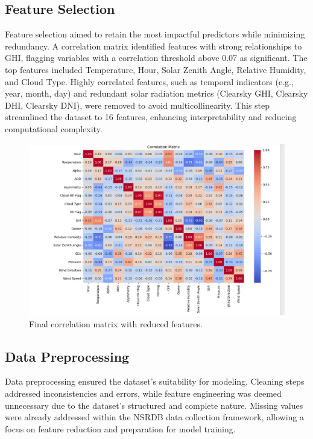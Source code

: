 \documentclass[10pt,twocolumn]{article}
\begin{document}
\begin{itemize}
\subsection{Feature Selection}
Feature selection aimed to retain the most impactful predictors while minimizing redundancy. A correlation matrix identified features with strong relationships to GHI, flagging variables with a correlation threshold above 0.07 as significant. The top features included Temperature, Hour, Solar Zenith Angle, Relative Humidity, and Cloud Type. Highly correlated features, such as temporal indicators (e.g., year, month, day) and redundant solar radiation metrics (Clearsky GHI, Clearsky DHI, Clearsky DNI), were removed to avoid multicollinearity. This step streamlined the dataset to 16 features, enhancing interpretability and reducing computational complexity.

\begin{figure}
    \centering
    \includegraphics[width=1\linewidth]{fincorr.png}
    \caption{Final correlation matrix with reduced features.}
    \label{Figure 1}
\end{figure}

\subsection{Data Preprocessing}
Data preprocessing ensured the dataset's suitability for modeling. Cleaning steps addressed inconsistencies and errors, while feature engineering was deemed unnecessary due to the dataset's structured and complete nature. Missing values were already addressed within the NSRDB data collection framework, allowing a focus on feature reduction and preparation for model training.


\end{itemize}
\end{document}

